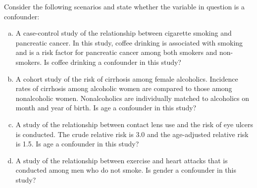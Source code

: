 
Consider the following scenarios and state whether the variable in question is a confounder:

\begin{enumerate}[(a)]
\item A case-control study of the relationship between cigarette smoking and pancreatic cancer.  In this study, coffee drinking is associated with smoking and is a risk factor for pancreatic cancer among both smokers and non-smokers.  Is coffee drinking a confounder in this study?


\item A cohort study of the risk of cirrhosis among female alcoholics.  Incidence rates of cirrhosis among alcoholic women are compared to those among nonalcoholic women.  Nonalcoholics are individually matched to alcoholics on month and year of birth.  Is age a confounder in this study?


\item A study of the relationship between contact lens use and the risk of eye ulcers is conducted.  The crude relative risk is 3.0 and the age-adjusted relative risk is 1.5.  Is age a confounder in this study?


\item A study of the relationship between exercise and heart attacks that is conducted among men who do not smoke.  Is gender a confounder in this study?


\end{enumerate}